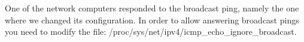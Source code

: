 One of the network computers responded to the broadcast ping, namely the one where we changed its configuration. In order to allow answering broadcast pings you need to modify the file: /proc/sys/net/ipv4/icmp_echo_ignore_broadcast.